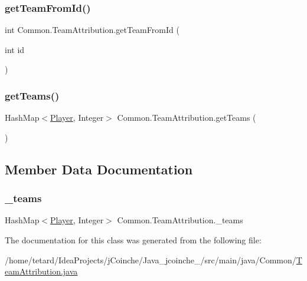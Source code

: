 \mbox{\label{classCommon_1_1TeamAttribution_a4dc4bc10ccb136c5859a29210dca6115}} 
\subsubsection{\texorpdfstring{get\+Team\+From\+Id()}{getTeamFromId()}}
{\footnotesize\ttfamily int Common.\+Team\+Attribution.\+get\+Team\+From\+Id (\begin{DoxyParamCaption}\item[{int}]{id }\end{DoxyParamCaption})\hspace{0.3cm}{\ttfamily [inline]}}

\mbox{\label{classCommon_1_1TeamAttribution_ae2b14573fa95f73bf00ca7df017a9b2c}} 
\subsubsection{\texorpdfstring{get\+Teams()}{getTeams()}}
{\footnotesize\ttfamily Hash\+Map$<$\mbox{\hyperlink{classCommon_1_1Player}{Player}}, Integer$>$ Common.\+Team\+Attribution.\+get\+Teams (\begin{DoxyParamCaption}{ }\end{DoxyParamCaption})\hspace{0.3cm}{\ttfamily [inline]}}



\subsection{Member Data Documentation}
\mbox{\label{classCommon_1_1TeamAttribution_abfb1f1db66ae40b6030fba06a65b88d8}} 
\subsubsection{\texorpdfstring{\+\_\+teams}{\_teams}}
{\footnotesize\ttfamily Hash\+Map$<$\mbox{\hyperlink{classCommon_1_1Player}{Player}}, Integer$>$ Common.\+Team\+Attribution.\+\_\+teams}



The documentation for this class was generated from the following file\+:\begin{DoxyCompactItemize}
\item 
/home/tetard/\+Idea\+Projects/j\+Coinche/\+Java\+\_\+jcoinche\+\_/src/main/java/\+Common/\mbox{\hyperlink{TeamAttribution_8java}{Team\+Attribution.\+java}}\end{DoxyCompactItemize}
